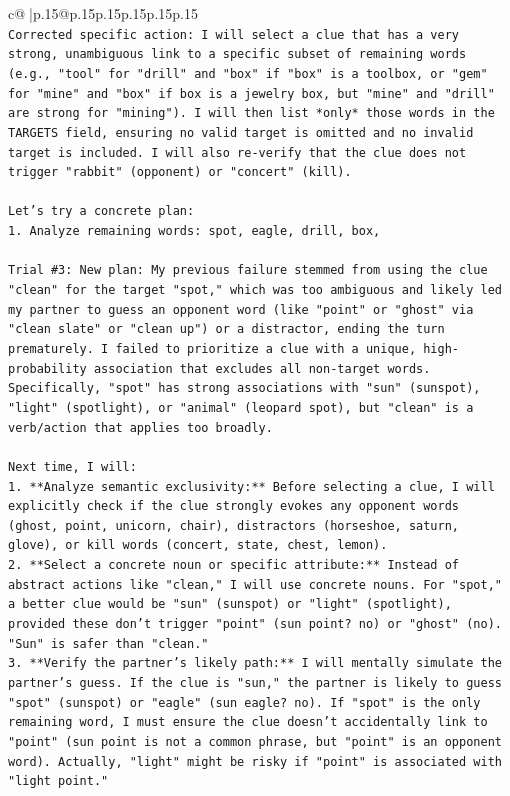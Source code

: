 \documentclass{article}
\begin{document}
{\begin{supertabular}{c@{$\;$}|p{.15\linewidth}@{}p{.15\linewidth}p{.15\linewidth}p{.15\linewidth}p{.15\linewidth}p{.15\linewidth}}
{{{\\ 
\texttt{Corrected specific action: I will select a clue that has a very strong, unambiguous link to a specific subset of remaining words (e.g., "tool" for "drill" and "box" if "box" is a toolbox, or "gem" for "mine" and "box" if box is a jewelry box, but "mine" and "drill" are strong for "mining"). I will then list *only* those words in the TARGETS field, ensuring no valid target is omitted and no invalid target is included. I will also re{-}verify that the clue does not trigger "rabbit" (opponent) or "concert" (kill).} \\
\\ 
\texttt{Let's try a concrete plan:} \\
\texttt{1. Analyze remaining words: spot, eagle, drill, box,} \\
\\ 
\texttt{Trial \#3: New plan: My previous failure stemmed from using the clue "clean" for the target "spot," which was too ambiguous and likely led my partner to guess an opponent word (like "point" or "ghost" via "clean slate" or "clean up") or a distractor, ending the turn prematurely. I failed to prioritize a clue with a unique, high{-}probability association that excludes all non{-}target words. Specifically, "spot" has strong associations with "sun" (sunspot), "light" (spotlight), or "animal" (leopard spot), but "clean" is a verb/action that applies too broadly.} \\
\\ 
\texttt{Next time, I will:} \\
\texttt{1.  **Analyze semantic exclusivity:** Before selecting a clue, I will explicitly check if the clue strongly evokes any opponent words (ghost, point, unicorn, chair), distractors (horseshoe, saturn, glove), or kill words (concert, state, chest, lemon).} \\
\texttt{2.  **Select a concrete noun or specific attribute:** Instead of abstract actions like "clean," I will use concrete nouns. For "spot," a better clue would be "sun" (sunspot) or "light" (spotlight), provided these don't trigger "point" (sun point? no) or "ghost" (no). "Sun" is safer than "clean."} \\
\texttt{3.  **Verify the partner's likely path:** I will mentally simulate the partner's guess. If the clue is "sun," the partner is likely to guess "spot" (sunspot) or "eagle" (sun eagle? no). If "spot" is the only remaining word, I must ensure the clue doesn't accidentally link to "point" (sun point is not a common phrase, but "point" is an opponent word). Actually, "light" might be risky if "point" is associated with "light point."} \\
}}}
\end{supertabular}}
\end{document}

